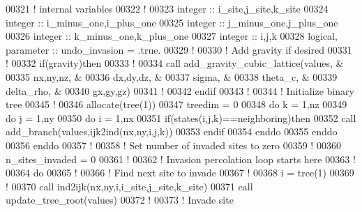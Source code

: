 \begin{DoxyCode}
00321     \textcolor{comment}{! internal variables}
00322     \textcolor{comment}{!}
00323     \textcolor{keywordtype}{integer} :: i\_site,j\_site,k\_site 
00324     \textcolor{keywordtype}{integer} :: i\_minus\_one,i\_plus\_one 
00325     \textcolor{keywordtype}{integer} :: j\_minus\_one,j\_plus\_one  
00326     \textcolor{keywordtype}{integer} :: k\_minus\_one,k\_plus\_one  
00327     \textcolor{keywordtype}{integer} :: i,j,k 
00328     \textcolor{keywordtype}{logical}, \textcolor{keywordtype}{parameter} :: undo\_invasion = .true.
00329     \textcolor{comment}{!}
00330     \textcolor{comment}{! Add gravity if desired}
00331     \textcolor{comment}{!}
00332     \textcolor{keyword}{if}(gravity)\textcolor{keyword}{then}
00333        \textcolor{comment}{!}
00334        call add\_gravity\_cubic\_lattice(values,    &
00335                                       nx,ny,nz,  &
00336                                       dx,dy,dz,  &
00337                                       sigma,     &
00338                                       theta\_c,   &
00339                                       delta\_rho, &
00340                                       gx,gy,gz)
00341        \textcolor{comment}{!}
00342     \textcolor{keyword}{endif}
00343     \textcolor{comment}{!}
00344     \textcolor{comment}{! Initialize binary tree}
00345     \textcolor{comment}{! }
00346     \textcolor{keyword}{allocate}(tree(1))
00347     treedim = 0
00348     \textcolor{keyword}{do} k = 1,nz
00349        \textcolor{keyword}{do} j = 1,ny
00350           \textcolor{keyword}{do} i = 1,nx
00351              \textcolor{keyword}{if}(states(i,j,k)==neighboring)\textcolor{keyword}{then}
00352                 call add\_branch(values,ijk2ind(nx,ny,i,j,k))
00353              \textcolor{keyword}{endif}
00354           \textcolor{keyword}{enddo}
00355        \textcolor{keyword}{enddo}
00356     \textcolor{keyword}{enddo}
00357     \textcolor{comment}{!}
00358     \textcolor{comment}{! Set number of invaded sites to zero}
00359     \textcolor{comment}{!}
00360     n\_sites\_invaded = 0
00361     \textcolor{comment}{!}
00362     \textcolor{comment}{! Invasion percolation loop starts here}
00363     \textcolor{comment}{!}
00364     \textcolor{keyword}{do}
00365        \textcolor{comment}{!}
00366        \textcolor{comment}{! Find next site to invade}
00367        \textcolor{comment}{!}
00368        i = tree(1)
00369        \textcolor{comment}{!}
00370        call ind2ijk(nx,ny,i,i\_site,j\_site,k\_site)
00371        call update\_tree\_root(values)
00372        \textcolor{comment}{!}
00373        \textcolor{comment}{! Invade site}

\end{DoxyCode}
